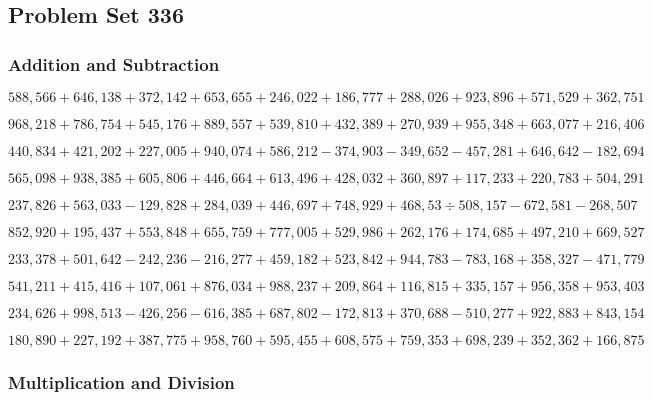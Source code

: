 \hypertarget{problem-set-336}{%
\subsection{Problem Set 336}\label{problem-set-336}}

\hypertarget{addition-and-subtraction}{%
\subsubsection{Addition and
Subtraction}\label{addition-and-subtraction}}

\(588,566+646,138+372,142+653,655+246,022+186,777+288,026+923,896+571,529+362,751\)

\(968,218+786,754+545,176+889,557+539,810+432,389+270,939+955,348+663,077+216,406\)

\(440,834+421,202+227,005+940,074+586,212-374,903-349,652-457,281+646,642-182,694\)

\(565,098+938,385+605,806+446,664+613,496+428,032+360,897+117,233+220,783+504,291\)

\(237,826+563,033-129,828+284,039+446,697+748,929+468,53÷508,157-672,581-268,507\)

\(852,920+195,437+553,848+655,759+777,005+529,986+262,176+174,685+497,210+669,527\)

\(233,378+501,642-242,236-216,277+459,182+523,842+944,783-783,168+358,327-471,779\)

\(541,211+415,416+107,061+876,034+988,237+209,864+116,815+335,157+956,358+953,403\)

\(234,626+998,513-426,256-616,385+687,802-172,813+370,688-510,277+922,883+843,154\)

\(180,890+227,192+387,775+958,760+595,455+608,575+759,353+698,239+352,362+166,875\)

\hypertarget{multiplication-and-division}{%
\subsubsection{Multiplication and
Division}\label{multiplication-and-division}}

